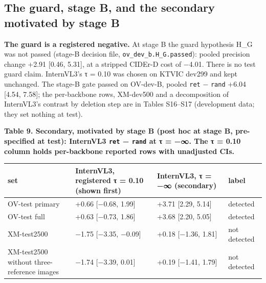 \subsection{The guard, stage B, and the secondary motivated by stage
B}\label{the-guard-stage-b-and-the-secondary-motivated-by-stage-b}

\textbf{The guard is a registered negative.} At stage B the guard hypothesis H\_G was not passed
(stage-B decision file, \texttt{ov\_dev\_b.H\_G.passed}): pooled precision change +2.91 {[}0.46,
5.31{]}, at a stripped CIDEr-D cost of −4.01. There is no test guard claim. InternVL3's τ = 0.10 was
chosen on KTVIC dev299 and kept unchanged. The stage-B gate passed on OV-dev-B, pooled \texttt{ret}
− \texttt{rand} +6.04 {[}4.54, 7.58{]}; the per-backbone rows, XM-dev500 and a decomposition of
InternVL3's contrast by deletion step are in Tables S16--S17 (development data; they set nothing at
test).

\textbf{Table 9. Secondary, motivated by stage B (post hoc at stage B, pre-specified at test):
InternVL3 \texttt{ret} − \texttt{rand} at τ = −∞. The τ = 0.10 column holds per-backbone reported
rows with unadjusted CIs.}

\begin{longtable}[]{@{}
  >{\raggedright\arraybackslash}p{}
  >{\raggedright\arraybackslash}p{}
  >{\raggedright\arraybackslash}p{}
  >{\raggedright\arraybackslash}p{}@{}}
\toprule\noalign{}
\begin{minipage}[b]{\linewidth}\raggedright
set
\end{minipage} & \begin{minipage}[b]{\linewidth}\raggedright
InternVL3, registered τ = 0.10 (shown first)
\end{minipage} & \begin{minipage}[b]{\linewidth}\raggedright
InternVL3, τ = −∞ (secondary)
\end{minipage} & \begin{minipage}[b]{\linewidth}\raggedright
label
\end{minipage} \\
\midrule\noalign{}
\endhead
\bottomrule\noalign{}
\endlastfoot
OV-test primary & +0.66 {[}−0.68, 1.99{]} & +3.71 {[}2.29, 5.14{]} & detected \\
OV-test full & +0.63 {[}−0.73, 1.86{]} & +3.68 {[}2.20, 5.05{]} & detected \\
XM-test2500 & −1.75 {[}−3.35, −0.09{]} & +0.18 {[}−1.36, 1.81{]} & not detected \\
XM-test2500 without three-reference images & −1.74 {[}−3.39, 0.01{]} & +0.19 {[}−1.41, 1.79{]} & not
detected \\
\end{longtable}

